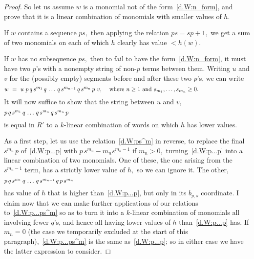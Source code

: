 \documentclass{amsart}
\begin{document}
\begin{proof}
So let us assume $w$ is a monomial not of the form~\eqref{d.W:n_form},
and prove that it is a linear combination of monomials
with smaller values of $h.$

If $w$ contains a sequence $ps,$ then applying the relation
$ps=sp+1,$ we get a sum of two monomials on each of which
$h$ clearly has value $<h(w).$

If $w$ has no subsequence $ps,$ then to fail
to have the form~\eqref{d.W:n_form}, it must have
two $\!p\!$'s with a nonempty string of non-$\!p\!$ terms between them.
Writing $u$ and $v$ for the (possibly empty) segments before and after
these two $\!p\!$'s, we can write
\begin{equation}\begin{minipage}[c]{35pc}\label{d.W:up...pv}
$w\ =\ u\ p\,q\,s^{m_1}\,q\,\dots\,q\,s^{m_{n-1}}\,q\,s^{m_n}\,p\ v,$
\quad where $n\geq 1$ and $s_{m_1},\dots,s_{m_n}\geq 0.$
\end{minipage}\end{equation}
It will now suffice to show that the string between $u$ and $v,$
\begin{equation}\begin{minipage}[c]{35pc}\label{d.W:p...p}
$p\,q\,s^{m_1}\,q\,\dots\,q\,s^{m_n}\,q\,s^{m_n}\,p$
\end{minipage}\end{equation}
is equal in $R'$ to a $\!k\!$-linear combination of words on which $h$
has lower values.

As a first step, let us use the relation~\eqref{d.W:ps^m} in
reverse, to replace the final $s^{m_n}\,p$ of~\eqref{d.W:p...p}
with $p\,s^{m_n} - m_n s^{m_n-1}$ if $m_n>0,$
turning~\eqref{d.W:p...p}
into a linear combination of two monomials.
One of these, the one arising from the $s^{m_n-1}$ term,
has a strictly lower value of $h,$ so we can ignore it.
The other,
\begin{equation}\begin{minipage}[c]{35pc}\label{d.W:p...ps^m}
$p\,q\,s^{m_1}\,q\,\dots\,q\,s^{m_{n-1}}\,q\,p\,s^{m_n}$
\end{minipage}\end{equation}
has value of $h$ that is higher than~\eqref{d.W:p...p},
but only in its $b_{p,s}$ coordinate.
I claim now that we can make further applications of
our relations to~\eqref{d.W:p...ps^m} so as to turn it into
a $\!k\!$-linear combination of monomials all involving
fewer $\!q\!$'s, and hence all having lower values of $h$
than~\eqref{d.W:p...p} has.
If $m_n=0$ (the case we temporarily excluded at the
start of this paragraph),~\eqref{d.W:p...ps^m}
is the same as~\eqref{d.W:p...p}; so in either case we have the latter
expression to consider.


\end{proof}
\end{document}
